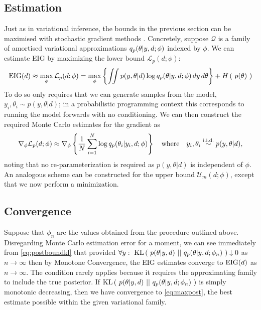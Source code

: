 \subsection{Estimation}
Just as in variational inference, the bounds in the previous section can be maximised with stochastic gradient methods \cite{robbins1951stochastic}. Concretely, suppose $\mathcal{Q}$ is a family of amortised variational approximations $q_p(\theta | y, d; \phi)$  indexed by $\phi$. We can estimate EIG by maximizing the lower bound $\mathcal{L}_p(d;\phi)$:
\begin{equation}
	\label{eq:maxpost}
	\text{EIG}(d) \approx \max_\phi \mathcal{L}_p(d;\phi) =
	\max_\phi \left\{ \iint p(y, \theta | d) \log q_p (\theta | y, d; \phi)\, dy\, d\theta  \right\} + H\left(\ p(\theta)\ \right)
\end{equation}
To do so only requires  that we can generate samples from the model,
$y_i, \theta_i \sim p(y, \theta | d)$; 
in a probabilistic programming context this corresponds to running the model forwards with no conditioning.
We can then construct the required Monte Carlo estimates for the gradient as
\begin{equation}
\nabla_{\phi} \mathcal{L}_p(d;\phi) \approx \nabla_\phi \left\{\frac{1}{N}\sum_{i=1}^N \log q_p(\theta_i|y_i, d; \phi)\right\} \quad \text{where} \quad y_i, \theta_i \overset{{\text{i.i.d.}}}{\sim} p(y, \theta | d),
\end{equation}
noting that no re-parameterization is required as $p(y,\theta|d)$ is independent of $\phi$.
An analogous scheme can be constructed for the upper bound $\mathcal{U}_m(d;\phi)$, except that we now
perform a minimization.

\subsection{Convergence}
Suppose that $\phi_n$ are the values obtained from the procedure outlined above. Disregarding Monte Carlo estimation error for a moment, we can see immediately from \eqref{eq:postboundkl} that provided $\forall y:\  \text{KL}\left(\ p(\theta | y, d)\ ||\ q_p(\theta|y, d; \phi_n)\ \right) \downarrow 0$ as $n \to \infty$ then by Monotone Convergence, the EIG estimates converge to $\text{EIG}(d)$ as $n \to \infty$. The condition rarely applies because it requires the approximating family to include the true posterior. If $\text{KL}\left(\ p(\theta | y, d)\ ||\ q_p(\theta|y, d; \phi_n)\ \right)$ is simply monotonic decreasing, then we have convergence to \eqref{eq:maxpost}, the best estimate possible within the given variational family.


